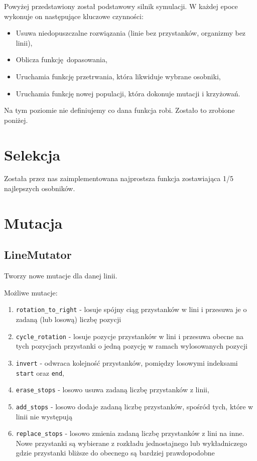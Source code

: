 \documentclass[12pt,a4paper,openright]{mwrep}
\begin{document}
	Powyżej przedstawiony został podstawowy silnik symulacji. W każdej epoce wykonuje on następujące kluczowe czynności:
	\begin{itemize}
		\item Usuwa niedopuszczalne rozwiązania (linie bez przystanków, organizmy bez linii),
		\item Oblicza funkcję dopasowania,
		\item Uruchamia funkcję przetrwania, która likwiduje wybrane osobniki,
		\item Uruchamia funkcję nowej populacji, która dokonuje mutacji i krzyżowań.
	\end{itemize}

	Na tym poziomie nie definiujemy co dana funkcja robi. Zostało to zrobione poniżej.

\section{Selekcja}
Została przez nas zaimplementowana najprostsza funkcja zostawiająca 1/5 najlepszych osobników.

\section{Mutacja}

\subsection{LineMutator}
Tworzy nowe mutacje dla danej linii.

Możliwe mutacje:

\begin{enumerate}
  \item \lstinline{rotation_to_right} - losuje spójny ciąg przystanków w lini i przesuwa je o zadaną (lub losową) liczbę pozycji
    \item \lstinline{cycle_rotation} - losuje pozycje przystanków w lini i przesuwa obecne na tych pozycjach przystanki o jedną pozycję w ramach wylosowanych pozycji
    \item \lstinline{invert} - odwraca kolejność przystanków, pomiędzy losowymi indeksami \lstinline{start} oraz \lstinline{end},
    \item \lstinline{erase_stops} - losowo usuwa zadaną liczbę przystanków z linii,
    \item \lstinline{add_stops} - losowo dodaje zadaną liczbę przystanków, spośród tych, które w linii nie występują
    \item \lstinline{replace_stops} - losowo zmienia zadaną liczbę przystanków z lini na inne. Nowe przystanki są wybierane z rozkładu jednostajnego lub wykładniczego gdzie przystanki bliższe do obecnego są bardziej prawdopodobne
\end{enumerate}
\end{document}
